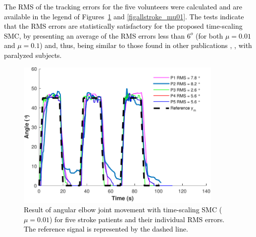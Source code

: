 \documentclass[review]{elsarticle}
\begin{document}
\textcolor{black}{The RMS of the tracking errors for the five volunteers were calculated and are available in the legend of 
Figures~\ref{figallstroke_mu001} and \ref{figallstroke_mu01}. The tests indicate that the RMS errors are statistically satisfactory for the proposed time-scaling SMC, by presenting an average of the RMS errors less than $6^{o}$ (for both $\mu=0.01$ and $\mu=0.1$) and, thus, being similar to those found in other publications \cite{FE:2014}, \cite{NE:2012}, \cite{AE:2009} with paralyzed subjects.}  
%
\begin{figure}[!htb]
\begin{center}
\includegraphics[width=10cm]{cabelograma2}
\caption{\textcolor{black}{Result of angular elbow joint movement with time-scaling SMC ($\mu=0.01$) for five stroke patients and their individual RMS errors. The reference signal is represented by the dashed line.}}
\label{figallstroke_mu001}
\end{center}
\end{figure}
%
\end{document}
